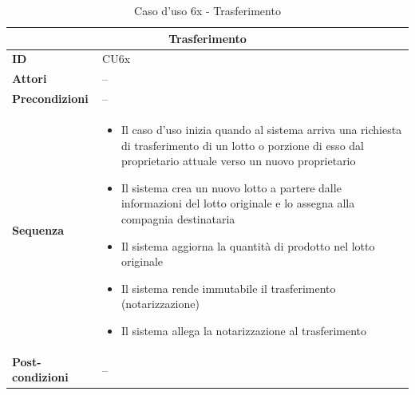\documentclass[a4paper,11pt]{article}
\begin{document}
\begin{table}[H]
  \centering
  \begin{tabular}{|m{2cm}|m{10.5cm}|}
    \hline
    \multicolumn{2}{|c|}{\textbf{Trasferimento}}          \\ \hline
    \multicolumn{1}{|l|}{\textbf{ID}}              & CU6x \\ \hline
    \multicolumn{1}{|l|}{\textbf{Attori}}          & --   \\ \hline
    \multicolumn{1}{|l|}{\textbf{Precondizioni}}   & --   \\ \hline
    \multicolumn{1}{|l|}{\textbf{Sequenza}}        &

    \begin{itemize}
      \item Il caso d'uso inizia quando al sistema arriva una richiesta di trasferimento di un lotto o porzione di esso dal proprietario attuale verso un nuovo proprietario
      \item Il sistema crea un nuovo lotto a partere dalle informazioni del lotto originale e lo assegna alla compagnia destinataria
      \item Il sistema aggiorna la quantità di prodotto nel lotto originale
      \item Il sistema rende immutabile il trasferimento (notarizzazione)
      \item Il sistema allega la notarizzazione al trasferimento

    \end{itemize}

    \\ \hline
    \multicolumn{1}{|l|}{\textbf{Post-condizioni}} &
    --
    \\ \hline
  \end{tabular}
  \caption{Caso d'uso 6x - Trasferimento}
  \label{cu:CU6x}
\end{table}
\end{document}
